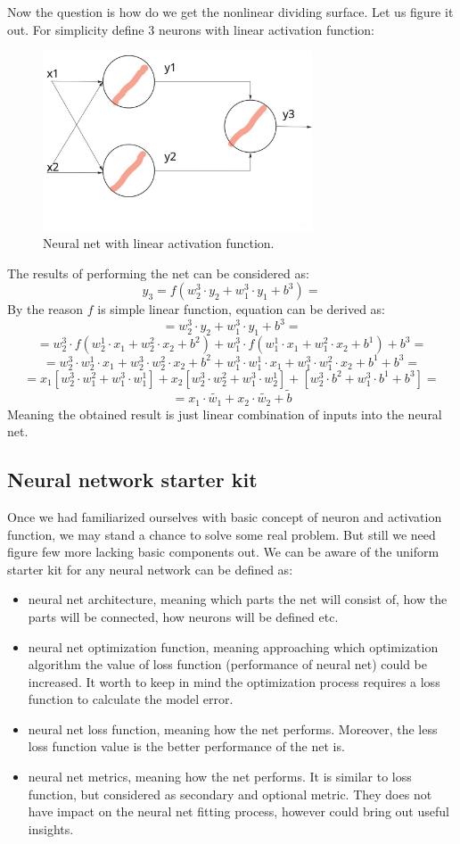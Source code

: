 \documentclass{article}
\begin{document}
Now the question is how do we get the nonlinear dividing surface. Let us figure it out.
For simplicity define 3 neurons with linear activation function:
\begin{figure}[h]
    \centering \includegraphics[width=8cm]{images/3_neurons_net.jpg}
    \caption {Neural net with linear activation function.}
\end{figure}
The results of performing the net can be considered as:
\[ y_3 = f(w_2^3 \cdot y_2+w_1^3 \cdot y_1+b^3) = \]
By the reason $f$ is simple linear function, equation can be derived as:
\[ = w_2^3 \cdot y_2+w_1^3 \cdot y_1+b^3 = \] 
\[ = w_2^3 \cdot f(w_2^1\cdot x_1+w_2^2 \cdot x_2+b^2) + w_1^3 \cdot f(w_1^1 \cdot x_1+w_1^2 \cdot x_2+b^1) + b^3 = \]   
\[ = w_2^3 \cdot w_2^1 \cdot x_1+w_2^3 \cdot w_2^2 \cdot x_2+b^2 + w_1^3 \cdot w_1^1 \cdot x_1+w_1^3 \cdot w_1^2 \cdot x_2+b^1+b^3 = \]
\[ = x_1[w_2^3 \cdot w_1^2 + w_1^3 \cdot w_1^1] + x_2[w_2^3 \cdot w_2^2 + w_1^3 \cdot w_2^1] + [w_2^3 \cdot b^2+w_1^3 \cdot b^1+b^3] = \]
\[ =  x_1\cdot \tilde{w_1} + x_2\cdot \tilde{w_2} + \tilde{b} \]
Meaning the obtained result is just linear combination of inputs into the neural net. 

\subsection{Neural network starter kit}
Once we had familiarized ourselves with basic concept of neuron and activation function, we may stand a chance to solve some real problem. But still we need figure few more lacking basic components out.
We can be aware of the uniform starter kit for any neural network can be defined as:
\begin{itemize}
    \item neural net architecture, meaning which parts the net will consist of, how the parts will be connected, how neurons will be defined etc.
    \item neural net optimization function, meaning approaching which optimization algorithm the value of loss function (performance of neural net) could be increased. It worth to keep in mind the optimization process requires a loss function to calculate the model error.
    \item neural net loss function, meaning how the net performs. Moreover, the less loss function value is the better performance of the net is.
    \item neural net metrics, meaning how the net performs. It is similar to loss function, but considered as secondary and optional metric. They does not have impact on the neural net fitting process, however could bring out useful insights.    
\end{itemize}
\end{document}
